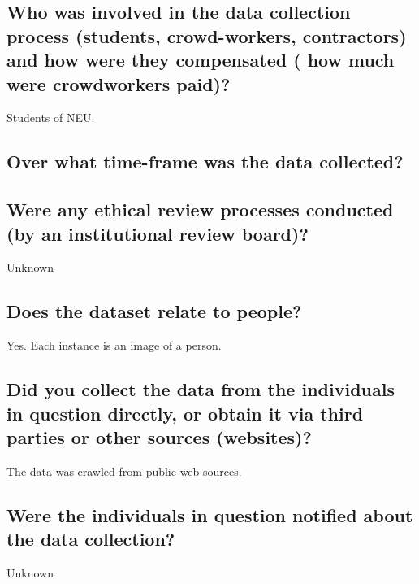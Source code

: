 \subsection*{Who was involved in the data collection process (\eg students, crowd-workers, contractors) and how were they compensated (\eg
how much were crowdworkers paid)?}

\noindent Students of NEU.

\subsection*{Over what time-frame was the data collected?}




\subsection*{Were any ethical review processes conducted (\eg by an institutional review board)?}
\noindent Unknown


\subsection*{Does the dataset relate to people?}
\noindent Yes. Each instance is an image of a person.

\subsection*{Did you collect the data from the individuals in question directly, or obtain it via third parties or other sources (\eg websites)?}
\noindent The data was crawled from public web sources.

\subsection*{Were the individuals in question notified about the data collection?}
\noindent Unknown

